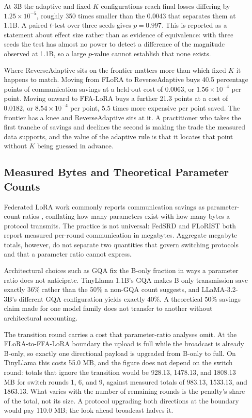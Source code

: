 At 3B the adaptive and fixed-$K$ configurations reach final losses differing by $1.25 \times 10^{-5}$, roughly 350 times smaller than the 0.0043 that separates them at 1.1B. A paired $t$-test over three seeds gives $p = 0.997$. This is reported as a statement about effect size rather than as evidence of equivalence: with three seeds the test has almost no power to detect a difference of the magnitude observed at 1.1B, so a large $p$-value cannot establish that none exists.

Where ReverseAdaptive sits on the frontier matters more than which fixed $K$ it happens to match. Moving from FLoRA to ReverseAdaptive buys 40.5 percentage points of communication savings at a held-out cost of 0.0063, or $1.56 \times 10^{-4}$ per point. Moving onward to FFA-LoRA buys a further 21.3 points at a cost of 0.0182, or $8.54 \times 10^{-4}$ per point, 5.5 times more expensive per point saved. The frontier has a knee and ReverseAdaptive sits at it. A practitioner who takes the first tranche of savings and declines the second is making the trade the measured data supports, and the value of the adaptive rule is that it locates that point without $K$ being guessed in advance.

\subsection{Measured Bytes and Theoretical Parameter Counts}
\label{sec:measuredbytes}
Federated LoRA work commonly reports communication savings as parameter-count ratios \cite{zhang2024federatedgpt,sun2024ffalora,wang2024flora,bai2024flexlora}, conflating how many parameters exist with how many bytes a protocol transmits. The practice is not universal: FedSRD \cite{yan2026fedsrd} and FLoRIST \cite{ramesh2026florist} both report measured per-round communication in megabytes. Aggregate megabyte totals, however, do not separate two quantities that govern switching protocols and that a parameter ratio cannot express.

Architectural choices such as GQA fix the B-only fraction in ways a parameter ratio does not anticipate. TinyLlama-1.1B's GQA makes B-only transmission save exactly 36\% rather than the 50\% a non-GQA count suggests, and LLaMA-3.2-3B's different GQA configuration yields exactly 40\%. A theoretical 50\% savings claim made for one model family does not transfer to another without architectural accounting.

The transition round carries a cost that parameter-ratio analyses omit. At the FLoRA-to-FFA-LoRA boundary the upload is full while the broadcast is already B-only, so exactly one directional payload is upgraded from B-only to full. On TinyLlama this costs 55.0 MB, and the figure does not depend on the switch round: totals that ignore the transition would be 928.13, 1478.13, and 1808.13 MB for switch rounds 1, 6, and 9, against measured totals of 983.13, 1533.13, and 1863.13. What varies with the number of remaining rounds is the penalty's share of the total, not its size. A protocol upgrading both directions at the boundary would pay 110.0 MB; the look-ahead broadcast halves it.

